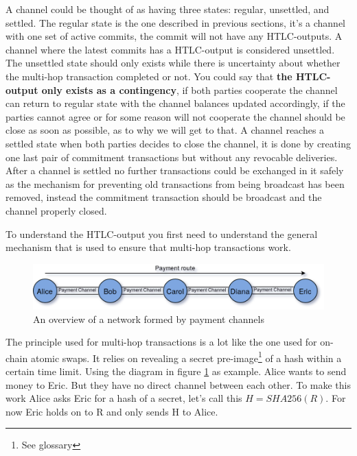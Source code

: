 A channel could be thought of as having three states: regular, unsettled, and settled. The regular state is the one described in previous sections, it's a channel with one set of active commits, the commit will not have any HTLC-outputs.\cite{lightningnetwork_2019} A channel where the latest commits has a HTLC-output is considered unsettled. The unsettled state should only exists while there is uncertainty about whether the multi-hop transaction completed or not. You could say that \textbf{the HTLC-output only exists as a contingency}, if both parties cooperate the channel can return to regular state with the channel balances updated accordingly, if the parties cannot agree or for some reason will not cooperate the channel should be close as soon as possible, as to why we will get to that.\cite{lightningnetwork_2019} A channel reaches a settled state when both parties decides to close the channel, it is done by creating one last pair of commitment transactions but without any revocable deliveries. After a channel is settled no further transactions could be exchanged in it safely as the mechanism for preventing old transactions from being broadcast has been removed, instead the commitment transaction should be broadcast and the channel properly closed.\cite{lightningnetwork_2019}\cite{bolt}

To understand the HTLC-output you first need to understand the general mechanism that is used to ensure that multi-hop transactions work. 

\begin{figure}[H]
	\centering
	\includegraphics[width=1\textwidth]{background/images/ln_route.png}
	\caption{An overview of a network formed by payment channels}
	\label{fig:pc-route}
\end{figure}

The principle used for multi-hop transactions is a lot like the one used for on-chain atomic swaps. It relies on revealing a secret pre-image\footnote{See glossary} of a hash within a certain time limit. Using the diagram in figure \ref{fig:pc-route} as example. Alice wants to send money to Eric. But they have no direct channel between each other. To make this work Alice asks Eric for a hash of a secret, let's call this $H = SHA256(R)$. For now Eric holds on to R and only sends H to Alice.

